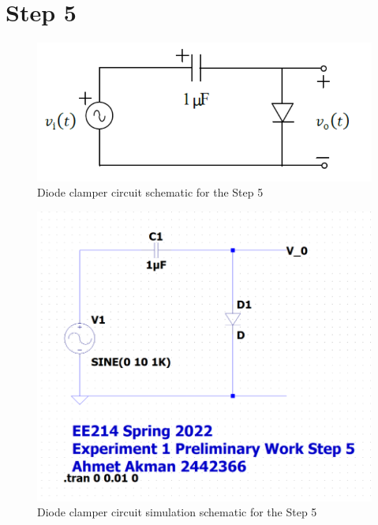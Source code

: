 \documentclass[letterpaper,12pt]{article}
\begin{document}
\section{Step 5}

\begin{figure}[H]
    \centering
   \includegraphics[width=1\textwidth]{5_1.png}
   \caption{Diode clamper circuit schematic for the Step 5}
\end{figure} 

\begin{figure}[H]
    \centering
   \includegraphics[width=1\textwidth]{5SCH.png}
   \caption{Diode clamper circuit simulation schematic for the Step 5}
\end{figure} 
\end{document}
